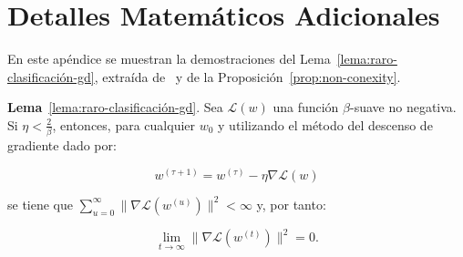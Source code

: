 
\chapter{Detalles Matemáticos Adicionales}\label{ap:apendiceA}

En este apéndice se muestran la demostraciones del Lema~\ref{lema:raro-clasificación-gd}, extraída de~\cite{Soudry2024} y de la Proposición~\ref{prop:non-conexity}.

\textbf{Lema}~\ref{lema:raro-clasificación-gd}. Sea $\mathcal{L}(w)$ una función $\beta$-suave no negativa. Si $\eta < \frac{2}{\beta}$, entonces, para cualquier $w_0$ y utilizando el método del descenso de gradiente dado por:

\[
    w^{(\tau + 1)} = w^{(\tau)} - \eta \nabla \mathcal{L}(w)
\]

se tiene que $\sum_{u=0}^{\infty} \| \nabla\mathcal{L}(w^{(u)}) \|^{2} < \infty$ y, por tanto:

\[
    \lim \limits_{t \to \infty} \| \nabla\mathcal{L}(w^{(t)}) \|^{2} = 0.
\]

